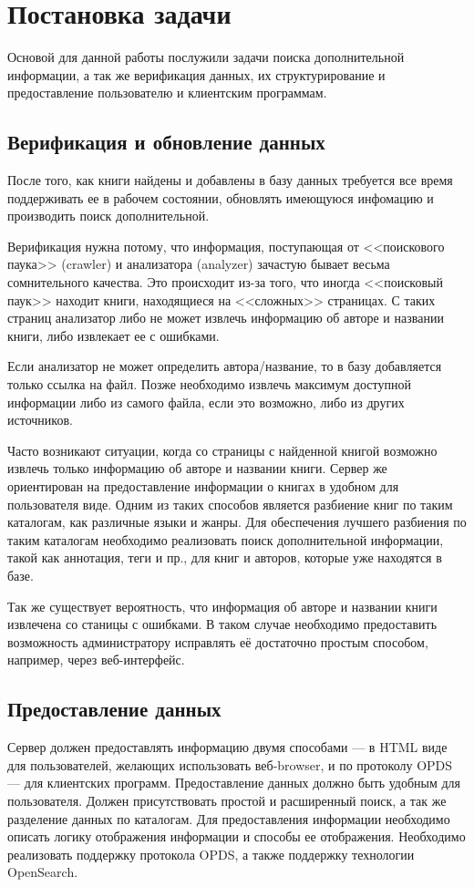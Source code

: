 \section{Постановка задачи}

Основой для данной работы послужили задачи поиска дополнительной информации, а так же верификация данных, их структурирование  и предоставление пользователю и клиентским программам.


\subsection{Верификация и обновление данных}

После того, как книги найдены и добавлены в базу данных требуется все время поддерживать ее в рабочем состоянии, обновлять имеющуюся инфомацию и производить поиск дополнительной.

Верификация нужна потому, что информация, поступающая от <<поискового паука>> (crawler) и анализатора (analyzer) зачастую бывает весьма сомнительного качества. Это происходит из-за того, что иногда <<поисковый паук>> находит книги, находящиеся на <<сложных>> страницах. С таких страниц анализатор либо не может извлечь информацию об авторе и названии книги, либо извлекает ее с ошибками. 

Если анализатор не может определить автора/название, то в базу добавляется только ссылка на файл. Позже необходимо извлечь максимум доступной информации либо из самого файла, если это возможно, либо из других источников.

Часто возникают ситуации, когда со страницы с найденной книгой возможно извлечь только информацию об авторе и названии книги. Сервер же ориентирован на предоставление информации о книгах в удобном для пользователя виде. Одним из таких способов является разбиение книг по таким каталогам, как различные языки и жанры. Для обеспечения лучшего разбиения по таким каталогам необходимо реализовать поиск дополнительной информации, такой как аннотация, теги и пр., для книг и авторов, которые уже находятся в базе.


Так же существует вероятность, что информация об авторе и названии книги извлечена со станицы с ошибками. В таком случае необходимо предоставить возможность администратору исправлять её достаточно простым способом, например, через веб-интерфейс.


\subsection{Предоставление данных}

Сервер должен предоставлять информацию двумя способами --- в HTML виде для пользователей, желающих использовать веб-browser, и по протоколу OPDS --- для клиентских программ. Предоставление данных должно быть удобным для пользователя. Должен присутствовать простой и расширенный поиск, а так же разделение данных по каталогам. Для предоставления информации необходимо описать логику отображения информации и способы ее отображения. Необходимо реализовать поддержку протокола OPDS, а также поддержку технологии OpenSearch.

\newpage